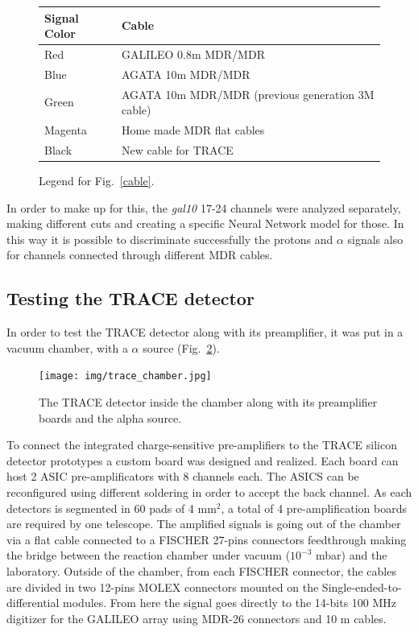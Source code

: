 \begin{figure}[h]
  \begin{tabular}{ll}
    Signal Color & Cable \\
    \midrule
    Red & GALILEO 0.8m MDR/MDR \\
    Blue & AGATA 10m MDR/MDR \\
    Green & AGATA 10m MDR/MDR (previous generation 3M cable) \\
    Magenta & Home made MDR flat cables \\
    Black & New cable for TRACE \\
    \bottomrule
  \end{tabular}
  \caption{Legend for Fig.~\ref{cable}.}
  \label{cables}
\end{figure}

\bigbreak

In order to make up for this, the \textit{gal10} 17-24 channels were analyzed
separately, making different cuts and creating a specific Neural Network model
for those. In this way it is possible to discriminate successfully the
protons and $\alpha$ signals also for channels connected through different MDR
cables.

\clearpage

\subsection{Testing the TRACE detector}

In order to test the TRACE detector along with its preamplifier, it was put in a vacuum chamber, with a $\alpha$ source (Fig.~\ref{trace_chamber}).

\begin{figure}[h]
  \centering
  \texttt{[image: img/trace\_chamber.jpg]}
  \caption{The TRACE detector inside the chamber along with its preamplifier boards and the alpha source.}
  \label{trace_chamber}
\end{figure}

\bigbreak

To connect the integrated charge-sensitive pre-amplifiers to the TRACE silicon detector prototypes a custom board was designed and realized. Each board can host 2 ASIC pre-amplificators with 8 channels each. The ASICS can be reconfigured using different soldering in order to accept the back channel. As each detectors is segmented in 60 pads of 4 mm$^2$, a total of 4 pre-amplification boards are required by one telescope.
The amplified signals is going out of the chamber via a flat cable connected to a FISCHER 27-pins connectors feedthrough making the bridge between the reaction chamber under vacuum ($10^{-3}$ mbar) and the laboratory. Outside of the chamber, from each FISCHER connector, the cables are divided in two 12-pins MOLEX connectors mounted on the Single-ended-to-differential modules. From here the signal goes directly to the 14-bits 100 MHz digitizer for the GALILEO array using MDR-26 connectors and 10 m cables.

